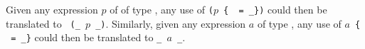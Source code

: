 
Given any expression $p$ of of type \Person, any use of {\tt ($p$ \{
  \id\ = \new\_\id \})} could then be translated to {\tt
  (\update\_\id\ $p$ \new\_\id)}. Similarly, given any expression $a$
of type \Address, any use of {\tt $a$ \{ \id\ = \new\_\id \}} could
then be translated to {\tt \update\_\id\ $a$ \new\_\id}.

